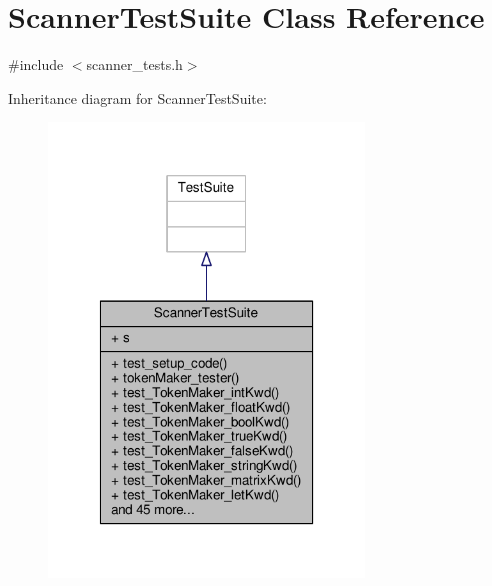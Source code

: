 \hypertarget{classScannerTestSuite}{\section{Scanner\-Test\-Suite Class Reference}
\label{classScannerTestSuite}
}


{\ttfamily \#include $<$scanner\-\_\-tests.\-h$>$}



Inheritance diagram for Scanner\-Test\-Suite\-:\nopagebreak
\begin{figure}[H]
\begin{center}
\leavevmode
\includegraphics[width=238pt]{classScannerTestSuite__inherit__graph}
\end{center}
\end{figure}


